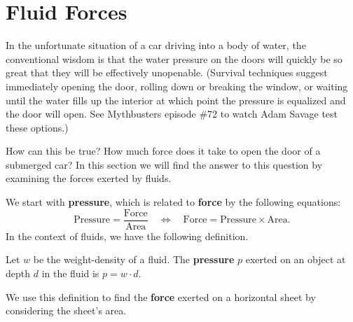 \section{Fluid Forces}\label{sec:fluid_force}

In the unfortunate situation of a car driving into a body of water, the conventional wisdom is that the water pressure on the doors will quickly be so great that they will be effectively unopenable. (Survival techniques suggest immediately opening the door, rolling down or breaking the window, or waiting until the water fills up the interior at which point the pressure is equalized and the door will open. See Mythbusters episode \#72 to watch Adam Savage test these options.)

How can this be true? How much force does it take to open the door of a submerged car? In this section we will find the answer to this question by examining the forces exerted by fluids.

We start with \textbf{pressure}, which is related to \textbf{force} by the following equations:
\[
\text{Pressure} = \frac{\text{Force}}{\text{Area}}
\quad  \Leftrightarrow \quad
\text{Force} = \text{Pressure}\times\text{Area}.
\]
In the context of fluids, we have the following definition.

\begin{definition}\label{def:fluid_pressure}%
Let $w$ be the weight-density of a fluid. The \textbf{pressure} $p$ exerted on an object at depth $d$ in the fluid is $p = w\cdot d.$
\end{definition}

We use this definition to find the \textbf{force} exerted on a horizontal sheet by considering the sheet's area.



